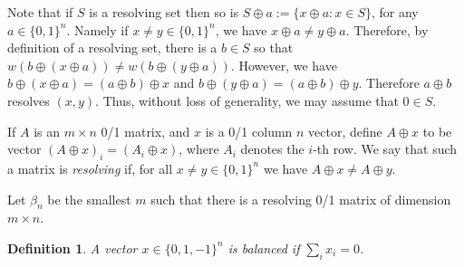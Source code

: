 \documentclass{article}
\newtheorem{definition}{Definition}
\begin{document}
Note that if $S$ is a resolving set then so is $S \oplus a := \{x
\oplus a : x \in S\}$, for any $a \in \{0,1\}^n$.  Namely if $x \ne y
\in \{0,1\}^n$, we have $x \oplus a \ne y \oplus a$.  Therefore, by
definition of a resolving set, there is a $b \in S$ so that $w(b
\oplus (x \oplus a)) \ne w(b \oplus (y \oplus a))$.  However, we have
$b \oplus (x \oplus a) = (a \oplus b) \oplus x$ and
$b \oplus (y \oplus a) = (a \oplus b) \oplus y$. Therefore $a \oplus
b$ resolves $(x,y)$.  Thus, without loss of generality, we may assume
that $0 \in S$.

If $A$ is an $m \times n$ 0/1 matrix, and $x$ is a 0/1 column $n$
vector, define $A \oplus x$ to be vector $(A \oplus x)_i = (A_i \oplus
x)$, where $A_i$ denotes the $i$-th row.  We say that such a matrix is
\emph{resolving} if, for all $x \ne y \in \{0,1\}^n$ we have $A \oplus
x \ne A \oplus y$.

Let $\beta_n$ be the smallest $m$ such that there is a resolving 0/1
matrix of dimension $m \times n$.

\begin{definition}
  A vector $x \in \{0,1,-1\}^n$ is \emph{balanced} if $\sum_i x_i = 0$.
\end{definition}
\end{document}
